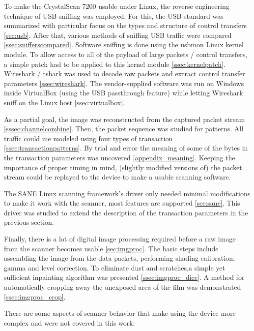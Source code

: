\documentclass{article}
\begin{document}
To make the CrystalScan 7200 usable under Linux, the reverse engineering technique
of USB sniffing was employed. For this, the USB standard was summarized with particular
focus on the types and structure of control transfers \autoref{sec:usb}. After that, various methods of
sniffing USB traffic were compared \autoref{ssec:snifferscompared}. Software sniffing is done using the usbmon
Linux kernel module. To allow access to all of the payload of large packets / control transfers,
a simple patch had to be applied to this kernel module \autoref{ssec:kernelpatch}. Wireshark / tshark was used
to decode raw packets and extract control transfer parameters \autoref{ssec:wireshark}. The vendor-supplied
software was run on Windows inside VirtualBox (using the USB passthrough feature)
while letting Wireshark sniff on the Linux host \autoref{ssec:virtualbox}.

As a partial goal, the image was reconstructed from the captured packet stream \autoref{sssec:channelcombine}.
Then, the packet sequence was studied for patterns. All traffic could me modeled
using four types of transaction \autoref{ssec:transactionpatterns}. By trial and error the meaning of some of the bytes
in the transaction parameters was uncovered \autoref{appendix_meaning}. Keeping the importance of proper timing
in mind, (slightly modified versions of) the packet stream could be replayed to the device
to make a usable scanning software.

The SANE Linux scanning framework's driver only needed minimal modifications
to make it work with the scanner, most features are supported \autoref{sec:sane}.
This driver was studied to extend the description
of the transaction parameters in the previous section.

Finally, there is a lot of digital image processing required before a raw image
from the scanner becomes usable \autoref{sec:imgproc}. The basic steps include assembling the image
from the data packets, performing shading calibration, gamma and level correction.
To eliminate dust and scratches,a simple yet sufficient inpainting algorithm
was presented \autoref{ssec:imgproc_dice}. A method for automatically cropping
away the unexposed area of the film was demonstrated \autoref{ssec:imgproc_crop}.

There are some aspects of scanner behavior that make using the device
more complex and were not covered in this work:
\end{document}
